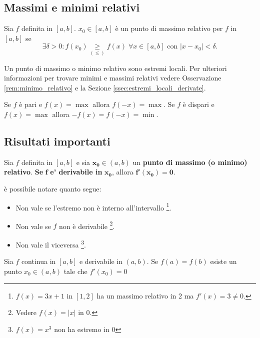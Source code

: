 \subsection{Massimi e minimi relativi}
\begin{definition}
    Sia $f$ definita in $[a,b]$. $x_0\in[a,b]$ è un punto di massimo relativo per $f$ in $[a,b]$ se
    \begin{equation*}
        \exists\delta>0\colon f(x_0)\underset{(\leq)}{\geq} f(x)\;\forall x\in[a,b] \text{ con } |x-x_0|<\delta.
    \end{equation*}
\end{definition}

Un punto di massimo o minimo relativo sono estremi locali. Per ulteriori informazioni per trovare minimi e massimi relativi vedere Osservazione \ref{rem:minimo_relativo} e la Sezione \ref{ssec:estremi_locali_derivate}.

\begin{remark}
    Se $f$ è pari e $f(x)=\max$ allora $f(-x)=\max$. Se $f$ è dispari e $f(x)=\max$ allora $-f(x)=f(-x)=\min$.
\end{remark}

\subsection{Risultati importanti}
\begin{theorem}[Fermat]\label{th:teorema_fermat}
    Sia $f$ definita in $[a,b]$ e sia $\boldsymbol{x_0}\in(a,b)$ un \textbf{punto di massimo (o minimo) relativo}. \textbf{Se} $\boldsymbol f$ \textbf{e' derivabile in} $\boldsymbol{x_0}$, allora $\boldsymbol{f'(x_0)=0}$.
\end{theorem}

\begin{remark}
    è possibile notare quanto segue:
    \begin{itemize}
        \item Non vale se l'estremo non è interno all'intervallo \footnote{$f(x)=3x+1$ in $[1,2]$ ha un massimo relativo in 2 ma $f'(x)=3\neq 0$.}.
        \item Non vale se $f$ non è derivabile \footnote{Vedere $f(x)=|x|$ in 0.}.
        \item Non vale il viceversa \footnote{$f(x)=x^3$ non ha estremo in 0}.
    \end{itemize}
\end{remark}

\begin{theorem}
    Sia $f$ continua in $[a,b]$ e derivabile in $(a,b)$. Se $f(a)=f(b)$ esiste un punto $x_0\in(a,b)$ tale che $f'(x_0)=0$
\end{theorem}

